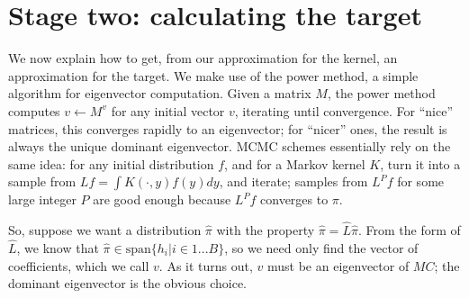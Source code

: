 \documentclass{article}
\newcommand\EMK[1]{\textcolor{purple}{EMK: #1}}
\begin{document}
\section{Stage two: calculating the target}
\label{BEMC-target}
We now explain how to get, from our approximation for the kernel, an approximation for the target. We make use of the power method, a simple algorithm for eigenvector computation. Given a matrix $M$, the power method computes $v\leftarrow M^v$ for any initial vector $v$, iterating until convergence. For ``nice'' matrices, this converges rapidly to an eigenvector; for ``nicer'' ones, the result is always the unique dominant eigenvector. MCMC schemes essentially rely on the same idea: for any initial distribution $f$, and for a Markov kernel $K$, turn it into a sample from $Lf=\int K(\cdot, y)f(y)dy$, and iterate; samples from $L^Pf$ for some large integer $P$ are good enough because $L^Pf$ converges to $\pi$. 

%
%

So, suppose we want a distribution $\hat{\pi}$ with the property $\hat{\pi}=\hat{L}\hat{\pi}$. From the form of $\hat{L}$, we know that $\hat{\pi}\in \text{span}\{h_i|i \in 1...B\}$, so we need only find the vector of coefficients, which we call $v$. As it turns out, $v$ must be an eigenvector of $MC$; the dominant eigenvector is the obvious choice.
\end{document}
